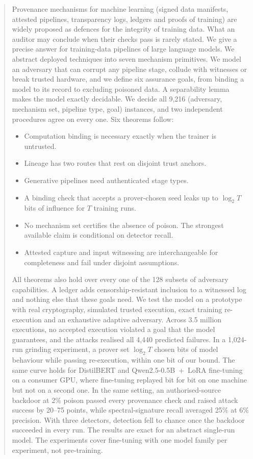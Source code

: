 \documentclass[journal,10pt]{IEEEtran}
\theoremstyle{definition}
\begin{document}
\begin{abstract}
Provenance mechanisms for machine learning (signed data manifests, attested pipelines,
transparency logs, ledgers and proofs of training) are widely proposed as defences for the
integrity of training data. What an auditor may conclude when their checks pass is rarely
stated. We give a precise answer for training-data pipelines of large language models.
We abstract deployed techniques into seven mechanism primitives. We model an adversary
that can corrupt any pipeline stage, collude with witnesses or break trusted hardware, and
we define six assurance goals, from binding a model to its record to excluding poisoned
data. A separability lemma makes the model exactly decidable. We decide all 9,216
(adversary, mechanism set, pipeline type, goal) instances, and two independent procedures
agree on every one. Six theorems follow:
\begin{itemize}
\item Computation binding is necessary exactly when the trainer is untrusted.
\item Lineage has two routes that rest on disjoint trust anchors.
\item Generative pipelines need authenticated stage types.
\item A binding check that accepts a prover-chosen seed leaks up to $\log_2T$ bits of
  influence for $T$ training runs.
\item No mechanism set certifies the absence of poison. The strongest available claim is
  conditional on detector recall.
\item Attested capture and input witnessing are interchangeable for completeness and fail
  under disjoint assumptions.
\end{itemize}
All theorems also hold over every one of the 128 subsets of adversary capabilities. A ledger
adds censorship-resistant inclusion to a witnessed log and nothing else that these goals
need. We test the model on a prototype with real cryptography, simulated trusted execution,
exact training re-execution and an exhaustive adaptive adversary. Across 3.5 million
executions, no accepted execution violated a goal that the model guarantees, and the attacks
realised all 4,440 predicted failures. In a 1,024-run grinding experiment, a prover set
$\log_2T$ chosen bits of model behaviour while passing re-execution, within one bit of our
bound. The same curve holds for DistilBERT and Qwen2.5-0.5B~+~LoRA fine-tuning on a consumer
GPU, where fine-tuning replayed bit for bit on one machine but not on a second one. In the same setting, an
authorised-source backdoor at 2\% poison passed every provenance check and raised attack
success by 20--75 points, while spectral-signature recall averaged 25\% at 6\% precision. With
three detectors, detection fell to chance once the backdoor succeeded in every run. The
results are exact for an abstract single-run model. The experiments cover fine-tuning with one
model family per experiment, not pre-training.
\end{abstract}
\end{document}
